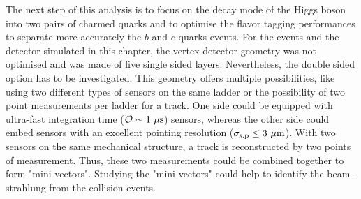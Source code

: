   The next step of this analysis is to focus on the decay mode of the Higgs boson into two pairs of charmed quarks and to optimise the flavor tagging performances to separate more accurately the $b$ and $c$ quarks events.
  For the events and the detector simulated in this chapter, the vertex detector geometry was not optimised and was made of five single sided layers.
  Nevertheless, the double sided option has to be investigated.
  This geometry offers multiple possibilities, like using two different types of sensors on the same ladder or the possibility of two point measurements per ladder for a track.
  One side could be equipped with ultra-fast integration time ($\mathcal{O} \sim 1~\rm{\mu s}$) sensors, whereas the other side could embed sensors with an excellent pointing resolution ($\sigma_{\rm{s.p}} \leq 3~\rm{\mu m}$).
  With two sensors on the same mechanical structure, a track is reconstructed by two points of measurement.
  Thus, these two measurements could be combined together to form "mini-vectors".
  Studying the "mini-vectors" could help to identify the beam-strahlung from the collision events.




